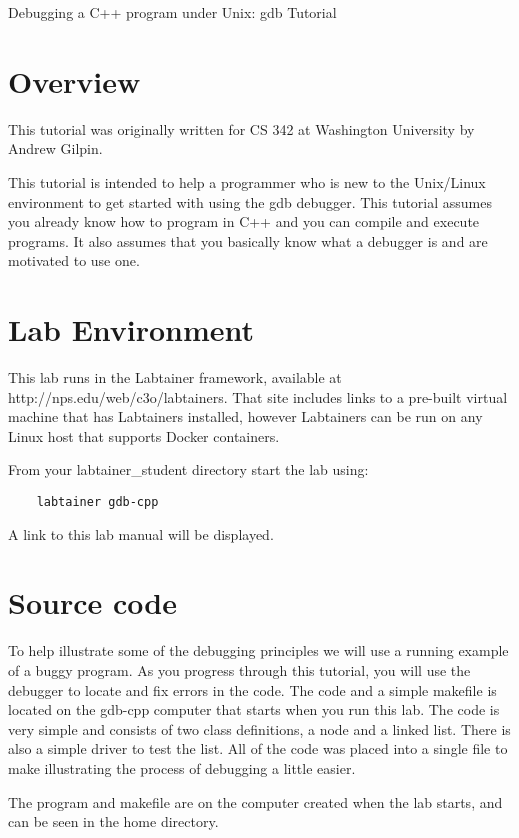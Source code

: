 


\begin{center}
{\LARGE Debugging a C++ program under Unix: gdb Tutorial}
\vspace{0.1in}\\
\end{center}

\section{Overview}
This tutorial was originally written for CS 342 at Washington University by Andrew Gilpin.

This tutorial is intended to help a programmer who is new to the Unix/Linux environment to get started with using the gdb debugger. This tutorial assumes you already know how to program in C++ and you can compile and execute programs. It also assumes that you basically know what a debugger is and are motivated to use one.

\section{Lab Environment}
\label{environment}
This lab runs in the Labtainer framework,
available at http://nps.edu/web/c3o/labtainers.
That site includes links to a pre-built virtual machine
that has Labtainers installed, however Labtainers can
be run on any Linux host that supports Docker containers.

From your labtainer_student directory start the lab using:
\begin{verbatim}
    labtainer gdb-cpp
\end{verbatim}
\noindent A link to this lab manual will be displayed.  
\section{Source code}
To help illustrate some of the debugging principles we will use a running example of a buggy program. As you progress through this tutorial, you will use the debugger to locate and fix errors in the code. The code and a simple makefile is located on the gdb-cpp computer that starts when you run this lab.
The code is very simple and consists of two class definitions, a node and a linked list. There is also a simple driver to test the list. All of the code was placed into a single file to make illustrating the process of debugging a little easier.

The program and makefile are on the computer created when the lab starts, and can be seen in the home directory.

